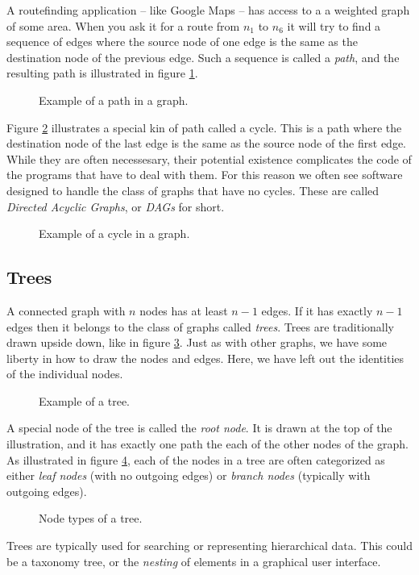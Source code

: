 A routefinding application -- like Google Maps -- has access to a a weighted graph of some area. When you ask it for a route from $n_1$ to $n_6$ it will try to find a sequence of edges where the source node of one edge is the same as the destination node of the previous edge. Such a sequence is called a \textsl{path}, and the resulting path is illustrated in figure \ref{fig:bs:graphs:path}.

\begin{figure}[tbp]
  
  \caption{Example of a path in a graph.}
  \label{fig:bs:graphs:path}
\end{figure}

Figure \ref{fig:bs:graphs:cycle} illustrates a special kin of path called a cycle. This is a path where the destination node of the last edge is the same as the source node of the first edge. While they are often necessesary, their potential existence complicates the code of the programs that have to deal with them. For this reason we often see software designed to handle the class of graphs that have no cycles. These are called \textsl{Directed Acyclic Graphs}, or \textsl{DAGs} for short.

\begin{figure}[tbp]
  
  \caption{Example of a cycle in a graph.}
  \label{fig:bs:graphs:cycle}
\end{figure}


\subsection{Trees}

A connected graph with $n$ nodes has at least $n-1$ edges. If it has exactly $n-1$ edges then it belongs to the class of graphs called \textsl{trees}. Trees are traditionally drawn upside down, like in figure \ref{fig:bs:graphs:trees}. Just as with other graphs, we have some liberty in how to draw the nodes and edges. Here, we have left out the identities of the individual nodes.

\begin{figure}[tbp]
  
  \caption{Example of a tree.}
  \label{fig:bs:graphs:trees}
\end{figure}

A special node of the tree is called the \textsl{root node}. It is drawn at the top of the illustration, and it has exactly one path the each of the other nodes of the graph. As illustrated in figure \ref{fig:bs:graphs:trees:nodetypes}, each of the nodes in a tree are often categorized as either \textsl{leaf nodes} (with no outgoing edges) or \textsl{branch nodes} (typically with outgoing edges).

\begin{figure}[tbp]
  
  \caption{Node types of a tree.}
  \label{fig:bs:graphs:trees:nodetypes}
\end{figure}

Trees are typically used for searching or representing hierarchical data. This could be a taxonomy tree, or the \textsl{nesting} of elements in a graphical user interface.

